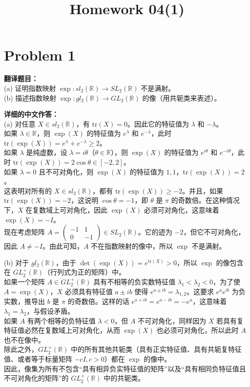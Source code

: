 \documentclass{ctexart}
\begin{document}
\title{Homework 04(1)}
\author{}
\date{}
\maketitle

\section*{Problem 1}
\textbf{翻译题目：}\\
(a) 证明指数映射 $\exp : sl_2(\mathbb{R}) \to SL_2(\mathbb{R})$ 不是满射。\\
(b) 描述指数映射 $\exp : gl_2(\mathbb{R}) \to GL_2(\mathbb{R})$ 的像（用共轭类来表述）。

\vspace{1em}
\textbf{详细的中文作答：}\\
(a) 对任意 $X \in sl_2(\mathbb{R})$，有 $\text{tr}(X) = 0$。因此它的特征值为 $\lambda$ 和 $-\lambda$。\\
如果 $\lambda \in \mathbb{R}$，则 $\exp(X)$ 的特征值为 $e^\lambda$ 和 $e^{-\lambda}$，此时 $\text{tr}(\exp(X)) = e^\lambda + e^{-\lambda} \ge 2$。\\
如果 $\lambda$ 是纯虚数，设 $\lambda = i\theta$（$\theta \in \mathbb{R}$），则 $\exp(X)$ 的特征值为 $e^{i\theta}$ 和 $e^{-i\theta}$，此时 $\text{tr}(\exp(X)) = 2\cos\theta \in [-2, 2]$。\\
如果 $\lambda = 0$ 且不可对角化，则 $\exp(X)$ 的特征值为 $1, 1$，$\text{tr}(\exp(X)) = 2$。\\
这表明对所有的 $X \in sl_2(\mathbb{R})$，都有 $\text{tr}(\exp(X)) \ge -2$。并且，如果 $\text{tr}(\exp(X)) = -2$，这说明 $\cos\theta = -1$，即 $\theta$ 是 $\pi$ 的奇数倍。在这种情况下，$X$ 在复数域上可对角化，因此 $\exp(X)$ 必须可对角化，这意味着 $\exp(X) = -I$。\\
现在考虑矩阵 $A = \begin{pmatrix} -1 & 1 \\ 0 & -1 \end{pmatrix} \in SL_2(\mathbb{R})$。它的迹为 $-2$，但它不可对角化，因此 $A \neq -I$。由此可知，$A$ 不在指数映射的像中，所以 $\exp$ 不是满射。

(b) 对于 $gl_2(\mathbb{R})$，由于 $\det(\exp(X)) = e^{\text{tr}(X)} > 0$，所以 $\exp$ 的像包含在 $GL_2^+(\mathbb{R})$（行列式为正的矩阵）中。\\
如果一个矩阵 $A \in GL_2^+(\mathbb{R})$ 具有不相等的负实数特征值 $\lambda_1 < \lambda_2 < 0$，为了使 $A = \exp(X)$，$X$ 必须具有特征值 $a \pm ib$ 使得 $e^{a \pm ib} = \lambda_{1,2}$。这要求 $e^a e^{ib}$ 为负实数，推导出 $b$ 是 $\pi$ 的奇数倍。这样的话 $e^{a+ib} = e^{a-ib} = -e^a$，这意味着 $\lambda_1 = \lambda_2$，与假设矛盾。\\
如果 $A$ 有两个相等的负特征值 $\lambda < 0$，但 $A$ 不可对角化，同样因为 $X$ 若具有复特征值必然在复数域上可对角化，从而 $\exp(X)$ 也必须可对角化，所以此时 $A$ 也不在像中。\\
除此之外，$GL_2^+(\mathbb{R})$ 中的所有其他共轭类（具有正实特征值、具有共轭复特征值、或者等于标量矩阵 $-cI, c>0$）都在 $\exp$ 的像中。\\
因此，像集为所有不包含“具有相异负实特征值的矩阵”以及“具有相同负特征值且不可对角化的矩阵”的 $GL_2^+(\mathbb{R})$ 中的共轭类。
\end{document}
